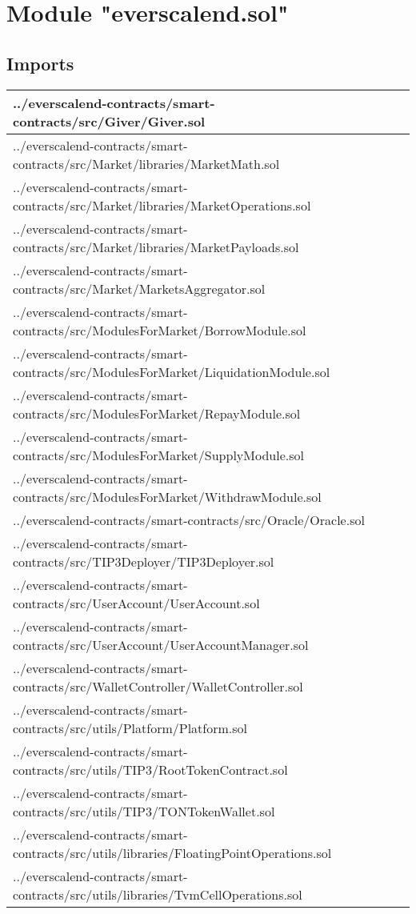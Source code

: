 
\section{Module "everscalend.sol"}


\subsection{Imports}


\noindent\begin{tabular}{|l|l|p{5cm}|}\hline
../everscalend-contracts/smart-contracts/src/Giver/Giver.sol &\\\hline
../everscalend-contracts/smart-contracts/src/Market/libraries/MarketMath.sol &\\\hline
../everscalend-contracts/smart-contracts/src/Market/libraries/MarketOperations.sol &\\\hline
../everscalend-contracts/smart-contracts/src/Market/libraries/MarketPayloads.sol &\\\hline
../everscalend-contracts/smart-contracts/src/Market/MarketsAggregator.sol &\\\hline
../everscalend-contracts/smart-contracts/src/ModulesForMarket/BorrowModule.sol &\\\hline
../everscalend-contracts/smart-contracts/src/ModulesForMarket/LiquidationModule.sol &\\\hline
../everscalend-contracts/smart-contracts/src/ModulesForMarket/RepayModule.sol &\\\hline
../everscalend-contracts/smart-contracts/src/ModulesForMarket/SupplyModule.sol &\\\hline
../everscalend-contracts/smart-contracts/src/ModulesForMarket/WithdrawModule.sol &\\\hline
../everscalend-contracts/smart-contracts/src/Oracle/Oracle.sol &\\\hline
../everscalend-contracts/smart-contracts/src/TIP3Deployer/TIP3Deployer.sol &\\\hline
../everscalend-contracts/smart-contracts/src/UserAccount/UserAccount.sol &\\\hline
../everscalend-contracts/smart-contracts/src/UserAccount/UserAccountManager.sol &\\\hline
../everscalend-contracts/smart-contracts/src/WalletController/WalletController.sol &\\\hline
../everscalend-contracts/smart-contracts/src/utils/Platform/Platform.sol &\\\hline
../everscalend-contracts/smart-contracts/src/utils/TIP3/RootTokenContract.sol &\\\hline
../everscalend-contracts/smart-contracts/src/utils/TIP3/TONTokenWallet.sol &\\\hline
../everscalend-contracts/smart-contracts/src/utils/libraries/FloatingPointOperations.sol &\\\hline
../everscalend-contracts/smart-contracts/src/utils/libraries/TvmCellOperations.sol &\\\hline
\end{tabular}

